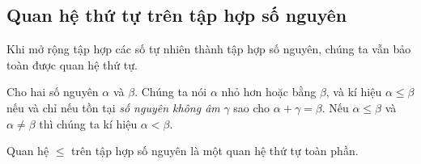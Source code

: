 \subsection*{Quan hệ thứ tự trên tập hợp số nguyên}

Khi mở rộng tập hợp các số tự nhiên thành tập hợp số nguyên, chúng ta vẫn bảo toàn được quan hệ thứ tự.

\begin{definition}
	Cho hai số nguyên $\alpha$ và $\beta$. Chúng ta nói $\alpha$ nhỏ hơn hoặc bằng $\beta$, và kí hiệu $\alpha\leq \beta$ nếu và chỉ nếu tồn tại \textit{số nguyên không âm} $\gamma$ sao cho $\alpha + \gamma = \beta$. Nếu $\alpha\leq \beta$ và $\alpha\ne \beta$ thì chúng ta kí hiệu $\alpha < \beta$.
\end{definition}

\begin{theorem}
	Quan hệ $\leq$ trên tập hợp số nguyên là một quan hệ thứ tự toàn phần.
\end{theorem}

